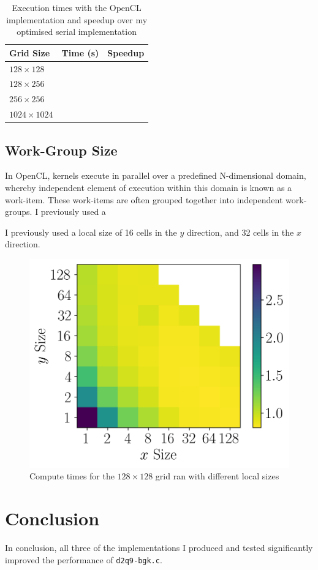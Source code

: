 \documentclass[twocolumn, a4paper]{article}
\begin{document}
\begin{table}[htbp]
  \begin{center}
  \caption{Execution times with the OpenCL implementation and speedup over my optimised serial implementation}\label{tab:OpenCL}
  \begin{tabular}[t]{l | l l} 
      \hline\hline
      Grid Size&Time (s)&Speedup\\
      \hline
      $128 \times 128$&\texttt{}&\texttt{}\\
      $128 \times 256$&\texttt{}&\texttt{}\\
      $256 \times 256$&\texttt{}&\texttt{}\\
      $1024 \times 1024$&\texttt{}&\texttt{}\\
      \hline
    \end{tabular}
  \end{center}
\end{table}

\subsection{Work-Group Size}

In OpenCL, kernels execute in parallel over a predefined N-dimensional domain, whereby independent element of execution within this domain is known as a work-item.
These work-items are often grouped together into independent work-groups.
I previously used a 



I previously used a local size of 16 cells in the $y$ direction, and 32 cells in the $x$ direction.

\begin{figure}[htbp]
  \centering
  \includegraphics[width=\linewidth]{wg_size.png}
  \caption{Compute times for the $128\times128$ grid ran with different local sizes}\label{fig:wg_size}
\end{figure}

\section{Conclusion}

In conclusion, all three of the implementations I produced and tested significantly improved the performance of \texttt{d2q9-bgk.c}.

\printbibliography
\end{document}
